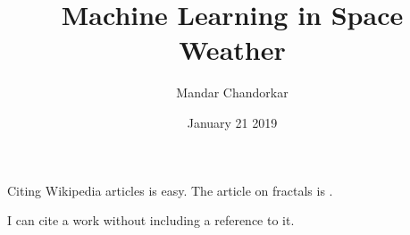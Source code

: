 \documentclass[12pt]{extarticle}
\title{Machine Learning in Space Weather}
\author{Mandar Chandorkar}
\date{January 21 2019}
\begin{document}
\maketitle



Citing Wikipedia articles is easy.  The article on fractals is \cite{fractalwiki}.

I can cite a work without including a reference to it.  \nocite{higham1998handbook}




\end{document}
